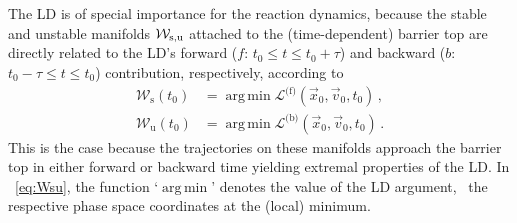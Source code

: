 \documentclass[aip,reprint,jcp,amsmath,amssymb,superscriptaddress,floatfix]{revtex4-1}
\DeclareMathOperator{\argmin}{arg\,min}
\begin{document}
The LD is of special importance for the reaction dynamics, because the stable 
and unstable manifolds $\mathcal{W}_\text{s,u}$ attached to the (time-dependent) barrier top are 
directly related to the LD's 
forward  ($f$: $t_0\leq t \leq t_0+\tau$) and
backward ($b$: $t_0-\tau \leq t \leq t_0$) contribution, respectively, 
according to \cite{hern15e,hern16a,hern16d}
% 
\begin{subequations}
\begin{align}
 \mathcal{W}_\text{s} (t_0) &= 
 \argmin \mathcal{L}^{\text{(f)}} (\vec x_0, \vec v_0, t_0) \,, \\
%  
 \mathcal{W}_\text{u} (t_0) &= 
 \argmin \mathcal{L}^{\text{(b)}} (\vec x_0, \vec v_0, t_0) \,.
\end{align}%
\label{eq:Wsu}%
\end{subequations}
% 
This is the case because the trajectories on these manifolds approach the 
barrier top in either forward or backward time yielding extremal properties of 
the LD.
% 
In \EQ~\eqref{eq:Wsu}, the function `$\argmin$' denotes the value of the LD
argument, \ie~the respective phase space coordinates at the (local) minimum.
\end{document}

